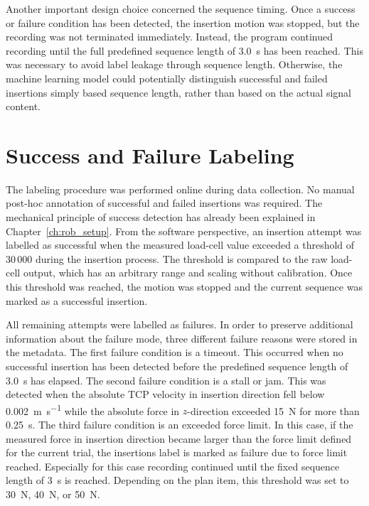 Another important design choice concerned the sequence timing. Once a success or failure condition has been detected, the insertion motion was stopped, but the recording was not terminated immediately. Instead, the program continued recording until the full predefined sequence length of \SI{3.0}{\second} has been reached. This was necessary to avoid label leakage through sequence length. Otherwise, the machine learning model could potentially distinguish successful and failed insertions simply based sequence length, rather than based on the actual signal content.

\section{Success and Failure Labeling}\label{sec:dataset_labeling}

The labeling procedure was performed online during data collection. No manual post-hoc annotation of successful and failed insertions was required. The mechanical principle of success detection has already been explained in Chapter~\ref{ch:rob_setup}. From the software perspective, an insertion attempt was labelled as successful when the measured load-cell value exceeded a threshold of 30\,000 during the insertion process. The threshold is compared to the raw load-cell output, which has an arbitrary range and scaling without calibration. Once this threshold was reached, the motion was stopped and the current sequence was marked as a successful insertion.

All remaining attempts were labelled as failures. In order to preserve additional information about the failure mode, three different failure reasons were stored in the metadata. The first failure condition is a timeout. This occurred when no successful insertion has been detected before the predefined sequence length of \SI{3.0}{\second} has elapsed. The second failure condition is a stall or jam. This was detected when the absolute TCP velocity in insertion direction fell below \SI{0.002}{\meter\per\second} while the absolute force in $z$-direction exceeded \SI{15}{\newton} for more than \SI{0.25}{\second}. The third failure condition is an exceeded force limit. In this case, if the measured force in insertion direction became larger than the force limit defined for the current trial, the insertions label is marked as failure due to force limit reached. Especially for this case recording continued until the fixed sequence length of \SI{3}{\second} is reached. Depending on the plan item, this threshold was set to \SI{30}{\newton}, \SI{40}{\newton}, or \SI{50}{\newton}.

